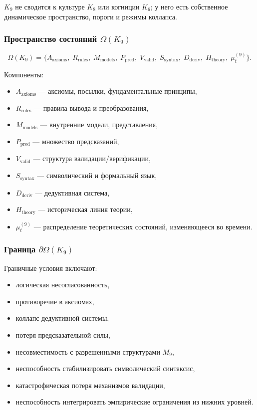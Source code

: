 $K_9$ не сводится к культуре $K_8$ или когниции $K_6$; у него есть собственное
динамическое пространство, пороги и режимы коллапса.

\subsubsection{Пространство состояний \texorpdfstring{$\Omega(K_9)$}{\Omega(K_9)}}

\[
\Omega(K_9)=
\{
A_{\mathrm{axioms}},\;
R_{\mathrm{rules}},\;
M_{\mathrm{models}},\;
P_{\mathrm{pred}},\;
V_{\mathrm{valid}},\;
S_{\mathrm{syntax}},\;
D_{\mathrm{deriv}},\;
H_{\mathrm{theory}},\;
\mu^{(9)}_t
\}.
\]

Компоненты:
\begin{itemize}
    \item $A_{\mathrm{axioms}}$ — аксиомы, посылки, фундаментальные принципы,
    \item $R_{\mathrm{rules}}$ — правила вывода и преобразования,
    \item $M_{\mathrm{models}}$ — внутренние модели, представления,
    \item $P_{\mathrm{pred}}$ — множество предсказаний,
    \item $V_{\mathrm{valid}}$ — структура валидации/верификации,
    \item $S_{\mathrm{syntax}}$ — символический и формальный язык,
    \item $D_{\mathrm{deriv}}$ — дедуктивная система,
    \item $H_{\mathrm{theory}}$ — историческая линия теории,
    \item $\mu^{(9)}_t$ — распределение теоретических состояний, изменяющееся во времени.
\end{itemize}

\subsubsection{Граница \texorpdfstring{$\partial\Omega(K_9)$}{\partial\Omega(K_9)}}

Граничные условия включают:
\begin{itemize}
    \item логическая несогласованность,
    \item противоречие в аксиомах,
    \item коллапс дедуктивной системы,
    \item потеря предсказательной силы,
    \item несовместимость с разрешенными структурами $M_9$,
    \item неспособность стабилизировать символический синтаксис,
    \item катастрофическая потеря механизмов валидации,
    \item неспособность интегрировать эмпирические ограничения из нижних уровней.
\end{itemize}

